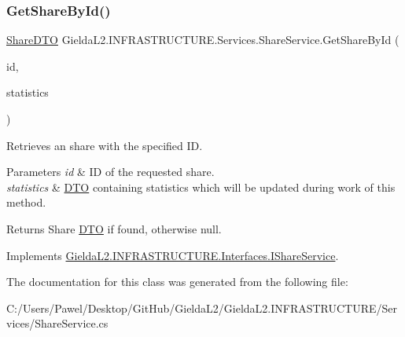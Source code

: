 \subsubsection{\texorpdfstring{GetShareById()}{GetShareById()}}
{\footnotesize\ttfamily \mbox{\hyperlink{class_gielda_l2_1_1_i_n_f_r_a_s_t_r_u_c_t_u_r_e_1_1_d_t_o_1_1_share_d_t_o}{Share\+D\+TO}} Gielda\+L2.\+I\+N\+F\+R\+A\+S\+T\+R\+U\+C\+T\+U\+R\+E.\+Services.\+Share\+Service.\+Get\+Share\+By\+Id (\begin{DoxyParamCaption}\item[{int}]{id,  }\item[{\mbox{\hyperlink{class_gielda_l2_1_1_i_n_f_r_a_s_t_r_u_c_t_u_r_e_1_1_d_t_o_1_1_statistics_d_t_o}{Statistics\+D\+TO}}}]{statistics }\end{DoxyParamCaption})}



Retrieves an share with the specified ID. 


\begin{DoxyParams}{Parameters}
{\em id} & ID of the requested share.\\
\hline
{\em statistics} & \mbox{\hyperlink{namespace_gielda_l2_1_1_i_n_f_r_a_s_t_r_u_c_t_u_r_e_1_1_d_t_o}{D\+TO}} containing statistics which will be updated during work of this method.\\
\hline
\end{DoxyParams}
\begin{DoxyReturn}{Returns}
Share \mbox{\hyperlink{namespace_gielda_l2_1_1_i_n_f_r_a_s_t_r_u_c_t_u_r_e_1_1_d_t_o}{D\+TO}} if found, otherwise null.
\end{DoxyReturn}


Implements \mbox{\hyperlink{interface_gielda_l2_1_1_i_n_f_r_a_s_t_r_u_c_t_u_r_e_1_1_interfaces_1_1_i_share_service_a3037a636d8565df70462f02ff735f22a}{Gielda\+L2.\+I\+N\+F\+R\+A\+S\+T\+R\+U\+C\+T\+U\+R\+E.\+Interfaces.\+I\+Share\+Service}}.



The documentation for this class was generated from the following file\+:\begin{DoxyCompactItemize}
\item 
C\+:/\+Users/\+Pawel/\+Desktop/\+Git\+Hub/\+Gielda\+L2/\+Gielda\+L2.\+I\+N\+F\+R\+A\+S\+T\+R\+U\+C\+T\+U\+R\+E/\+Services/Share\+Service.\+cs\end{DoxyCompactItemize}

